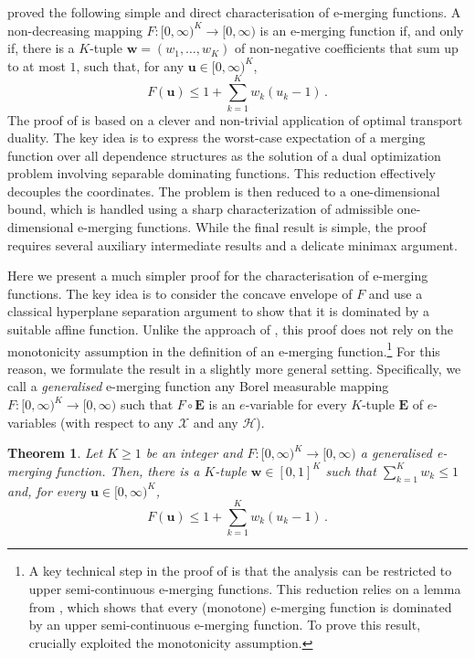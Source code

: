 \documentclass[3p, authoryear, 10pt]{elsarticle}%
\newtheorem{theorem}{Theorem}
\newcommand{\Hh}{\mathcal H}
\newcommand{\X}{\mathcal X}
\begin{document}
\cite{wang25only} proved the following simple and direct characterisation of e-merging functions. A non-decreasing mapping $F:[0,\infty)^K\to [0,\infty)$ is an e-merging function if, and only if, there is a $K$-tuple $\mathbf w = (w_1,\dots, w_K)$ of non-negative coefficients that sum up to at most $1$, such that, for any $\mathbf u \in [0,\infty)^K$,
$$F(\mathbf u) \leq 1 + \sum_{k=1}^K w_k(u_k-1)\,.$$
The proof of \cite{wang25only} is based on a clever and non-trivial application of optimal transport duality. The key idea is to express the worst-case expectation of a merging function over all dependence structures as the solution of a dual optimization problem involving separable dominating functions. This reduction effectively decouples the coordinates. The problem is then reduced to a one-dimensional bound, which is handled using a sharp characterization of admissible one-dimensional e-merging functions. While the final result is simple, the proof requires several auxiliary intermediate results and a delicate minimax argument.

Here we present a much simpler proof for the characterisation of e-merging functions. The key idea is to consider the concave envelope of $F$ and use a classical hyperplane separation argument to show that it is dominated by a suitable affine function. Unlike the approach of \cite{wang25only}, this proof does not rely on the monotonicity assumption in the definition of an e-merging function.\footnote{A key technical step in the proof of \cite{wang25only} is that the analysis can be restricted to upper semi-continuous e-merging functions. This reduction relies on a lemma from \cite{vovk2021evalues}, which shows that every (monotone) e-merging function is dominated by an upper semi-continuous e-merging function. To prove this result, \cite{vovk2021evalues} crucially exploited the monotonicity assumption.} For this reason, we formulate the result in a slightly more general setting. Specifically, we call a \emph{generalised} e-merging function  any Borel measurable mapping $F:[0,\infty)^K\to[0,\infty)$ such that $F \circ \mathbf E$ is an $e$-variable for every $K$-tuple $\mathbf E$ of $e$-variables (with respect to any $\X$ and any $\Hh$).

\begin{theorem}\label{thm:main}
    Let $K\geq 1$ be an integer and $F:[0,\infty)^K\to[0,\infty)$ a generalised e-merging function. Then, there is a $K$-tuple $\mathbf w \in [0,1]^K$ such that $\sum_{k=1}^K w_k\leq 1$ and, for every $\mathbf u\in [0,\infty)^K$,
    $$F(\mathbf u) \leq 1 + \sum_{k=1}^K w_k(u_k-1)\,.$$
\end{theorem}
\end{document}
